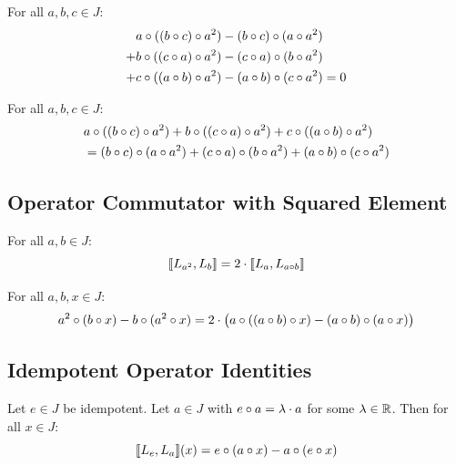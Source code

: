 \begin{theorem}
For all $a, b, c \in J$:
\begin{align*}
&a \circ ((b \circ c) \circ a^{2}) - (b \circ c) \circ (a \circ a^{2}) \\
+ &b \circ ((c \circ a) \circ a^{2}) - (c \circ a) \circ (b \circ a^{2}) \\
+ &c \circ ((a \circ b) \circ a^{2}) - (a \circ b) \circ (c \circ a^{2}) = 0
\end{align*}
\end{theorem}

\begin{theorem}
For all $a, b, c \in J$:
\begin{align*}
&a \circ ((b \circ c) \circ a^{2}) + b \circ ((c \circ a) \circ a^{2}) + c \circ ((a \circ b) \circ a^{2}) \\
&= (b \circ c) \circ (a \circ a^{2}) + (c \circ a) \circ (b \circ a^{2}) + (a \circ b) \circ (c \circ a^{2})
\end{align*}
\end{theorem}

\subsection{Operator Commutator with Squared Element}

\begin{theorem}
For all $a, b \in J$:
\[ \llbracket L_{a^{2}}, L_{b} \rrbracket = 2 \cdot \llbracket L_{a}, L_{a \circ b} \rrbracket \]
\end{theorem}

\begin{theorem}
For all $a, b, x \in J$:
\[ a^{2} \circ (b \circ x) - b \circ (a^{2} \circ x) = 2 \cdot \bigl( a \circ ((a \circ b) \circ x) - (a \circ b) \circ (a \circ x) \bigr) \]
\end{theorem}

\subsection{Idempotent Operator Identities}

\begin{theorem}
Let $e \in J$ be idempotent. Let $a \in J$ with $e \circ a = \lambda \cdot a$ for some $\lambda \in \mathbb{R}$. Then for all $x \in J$:
\[ \llbracket L_{e}, L_{a} \rrbracket(x) = e \circ (a \circ x) - a \circ (e \circ x) \]
\end{theorem}

